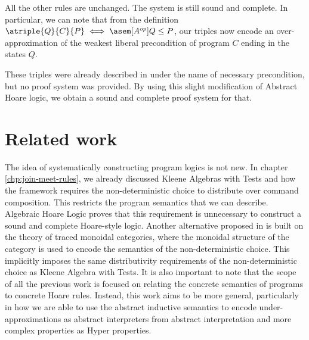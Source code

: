 All the other rules are unchanged. The system is still sound and complete. In
particular, we can note that from the definition $\atriple{Q}{C}{P} \iff
\asem[A^{op}]{Q} \leq P$, our triples now encode an over-approximation of the
weakest liberal precondition of program $C$ ending in the states $Q$.

These triples were already described in \cite{Cousot13} under the name of
necessary precondition, but no proof system was provided. By using this slight
modification of Abstract Hoare logic, we obtain a sound and complete proof
system for that.

\section{Related work}
The idea of systematically constructing program logics is not new. In chapter
\ref{chp:join-meet-rules}, we already discussed Kleene Algebras with Tests
\cite{Kozen97} and how the framework requires the non-deterministic choice to
distribute over command composition. This restricts the program semantics that
we can describe. Algebraic Hoare Logic proves that this requirement is
unnecessary to construct a sound and complete Hoare-style logic. Another
alternative proposed in \cite{Martin06} is built on the theory of traced
monoidal categories, where the monoidal structure of the category is used to
encode the semantics of the non-deterministic choice. This implicitly imposes
the same distributivity requirements of the non-deterministic choice as Kleene
Algebra with Tests. 
It is also important to note that the scope of all the
previous work is focused on relating the concrete semantics of programs to
concrete Hoare rules. Instead, this work aims to be more general, particularly
in how we are able to use the abstract inductive semantics to encode
under-approximations as abstract interpreters from abstract interpretation and
more complex properties as Hyper properties.

